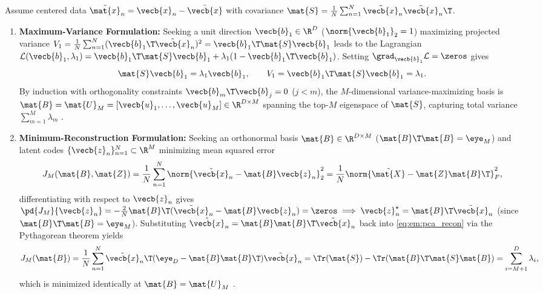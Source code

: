 \documentclass[../../../../master.tex]{subfiles}
\begin{document}
\begin{coremath}
\label{thm:em:pca_equiv}
Assume centered data $\tilde{\mat{x}}_n = \vecb{x}_n - \bar{\vecb{x}}$ with covariance $\mat{S} = \frac{1}{N}\sum_{n=1}^N \tilde{\vecb{x}}_n\tilde{\vecb{x}}_n\T$.
\begin{enumerate}
  \item \textbf{Maximum-Variance Formulation:} Seeking a unit direction $\vecb{b}_1 \in \R^D$ ($\norm{\vecb{b}_1}_2 = 1$) maximizing projected variance $V_1 = \frac{1}{N}\sum_{n=1}^N (\vecb{b}_1\T \tilde{\vecb{x}}_n)^2 = \vecb{b}_1\T \mat{S} \vecb{b}_1$ leads to the Lagrangian $\mathcal{L}(\vecb{b}_1, \lambda_1) = \vecb{b}_1\T \mat{S} \vecb{b}_1 + \lambda_1(1 - \vecb{b}_1\T \vecb{b}_1)$. Setting $\grad_{\vecb{b}_1}\mathcal{L} = \zeros$ gives
  \begin{equation}
    \mat{S}\vecb{b}_1 = \lambda_1 \vecb{b}_1, \qquad V_1 = \vecb{b}_1\T \mat{S} \vecb{b}_1 = \lambda_1.
    \label{eq:em:pca_eig}
  \end{equation}
  By induction with orthogonality constraints $\vecb{b}_m\T \vecb{b}_j = 0$ ($j < m$), the $M$-dimensional variance-maximizing basis is $\mat{B} = \mat{U}_M = [\vecb{u}_1, \dots, \vecb{u}_M] \in \R^{D \times M}$ spanning the top-$M$ eigenspace of $\mat{S}$, capturing total variance $\sum_{m=1}^M \lambda_m$ .

  \item \textbf{Minimum-Reconstruction Formulation:} Seeking an orthonormal basis $\mat{B} \in \R^{D \times M}$ ($\mat{B}\T\mat{B} = \eye_M$) and latent codes $\{\vecb{z}_n\}_{n=1}^N \subset \R^M$ minimizing mean squared error
  \begin{equation}
    J_M(\mat{B}, \mat{Z}) = \frac{1}{N}\sum_{n=1}^N \norm{\tilde{\vecb{x}}_n - \mat{B}\vecb{z}_n}_2^2 = \frac{1}{N}\norm{\tilde{\mat{X}} - \mat{Z}\mat{B}\T}_F^2,
    \label{eq:em:pca_recon}
  \end{equation}
  differentiating with respect to $\vecb{z}_n$ gives $\pd{J_M}{\vecb{z}_n} = -\frac{2}{N}\mat{B}\T(\tilde{\vecb{x}}_n - \mat{B}\vecb{z}_n) = \zeros \implies \vecb{z}_n^\star = \mat{B}\T\tilde{\vecb{x}}_n$ (since $\mat{B}\T\mat{B} = \eye_M$). Substituting $\hat{\vecb{x}}_n = \mat{B}\mat{B}\T\tilde{\vecb{x}}_n$ back into \eqref{eq:em:pca_recon} via the Pythagorean theorem yields
  \begin{equation}
    J_M(\mat{B}) = \frac{1}{N}\sum_{n=1}^N \tilde{\vecb{x}}_n\T(\eye_D - \mat{B}\mat{B}\T)\tilde{\vecb{x}}_n = \Tr(\mat{S}) - \Tr(\mat{B}\T\mat{S}\mat{B}) = \sum_{i=M+1}^D \lambda_i,
    \label{eq:em:pca_resid}
  \end{equation}
  which is minimized identically at $\mat{B} = \mat{U}_M$ .


\end{enumerate}
\end{coremath}
\end{document}
